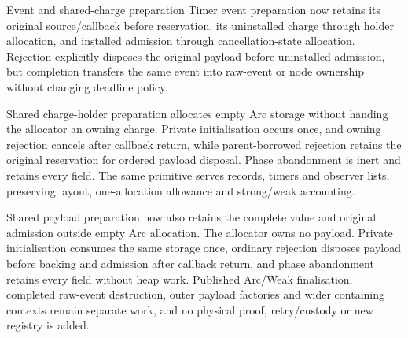 \begin{implementationdetail}{Event and shared-charge preparation}
Timer event preparation now retains its original source/callback before
reservation, its uninstalled charge through holder allocation, and installed
admission through cancellation-state allocation. Rejection explicitly disposes
the original payload before uninstalled admission, but completion transfers the
same event into raw-event or node ownership without changing deadline policy.

Shared charge-holder preparation allocates empty Arc storage without handing
the allocator an owning charge. Private initialisation occurs once, and owning
rejection cancels after callback return, while parent-borrowed rejection retains
the original reservation for ordered payload disposal. Phase abandonment is
inert and retains every field. The same primitive serves records, timers and
observer lists, preserving layout, one-allocation allowance and strong/weak
accounting.

Shared payload preparation now also retains the complete value and
original admission outside empty Arc allocation. The allocator owns no payload.
Private initialisation consumes the same storage once, ordinary rejection
disposes payload before backing and admission after callback return, and phase
abandonment retains every field without heap work. Published Arc/Weak
finalisation, completed raw-event destruction, outer payload factories and wider
containing contexts remain separate work, and no
physical proof, retry/custody or new registry is added.
\end{implementationdetail}

